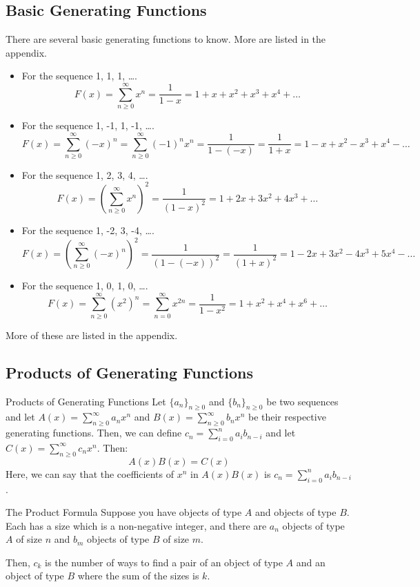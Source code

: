 \documentclass[letterpaper]{article}
\begin{document}
\subsection{Basic Generating Functions}
There are several basic generating functions to know. More are listed in the appendix.
\begin{itemize}
    \item For the sequence 1, 1, 1, \dots.
    \[F(x) = \sum_{n \geq 0}^{\infty} x^n = \frac{1}{1 - x} = 1 + x + x^2 + x^3 + x^4 + \dots\]
    
    \item For the sequence 1, -1, 1, -1, \dots.
    \[F(x) = \sum_{n \geq 0}^{\infty} (-x)^n = \sum_{n \geq 0}^{\infty} (-1)^n x^n = \frac{1}{1 - (-x)} = \frac{1}{1 + x} = 1 - x + x^2 - x^3 + x^4 - \dots\]
    
    \item For the sequence 1, 2, 3, 4, \dots.
    \[F(x) = \left(\sum_{n \geq 0}^{\infty} x^n\right)^2 = \frac{1}{(1 - x)^2} = 1 + 2x + 3x^2 + 4x^3 + \dots\]
    
    \item For the sequence 1, -2, 3, -4, \dots.
    \[F(x) = \left(\sum_{n \geq 0}^{\infty} (-x)^n\right)^2 = \frac{1}{(1 - (-x))^2} = \frac{1}{(1 + x)^2} = 1 - 2x + 3x^2 - 4x^3 + 5x^4 - \dots\]

    \item For the sequence 1, 0, 1, 0, \dots.
    \[F(x) = \sum_{n \geq 0}^{\infty} (x^2)^n = \sum_{n = 0}^{\infty} x^{2n} = \frac{1}{1 - x^2} = 1 + x^2 + x^4 + x^6 + \dots\]
\end{itemize}
More of these are listed in the appendix. 

\subsection{Products of Generating Functions}
\begin{lemma}{Products of Generating Functions}{}
    Let $\{a_n\}_{n \geq 0}$ and $\{b_n\}_{n \geq 0}$ be two sequences and let $A(x) = \sum_{n \geq 0}^{\infty} a_n x^n$ and $B(x) = \sum_{n \geq 0}^{\infty} b_n x^n$ be their respective generating functions. Then, we can define $c_n = \sum_{i = 0}^n a_i b_{n - i}$ and let $C(x) = \sum_{n \geq 0}^{\infty} c_n x^n$. Then:
    \[A(x)B(x) = C(x)\]
    Here, we can say that the coefficients of $x^n$ in $A(x)B(x)$ is $c_n = \sum_{i = 0}^n a_i b_{n - i}$.  
\end{lemma} 

\begin{theorem}{The Product Formula}{}
    Suppose you have objects of type $A$ and objects of type $B$. Each has a size which is a non-negative integer, and there are $a_n$ objects of type $A$ of size $n$ and $b_m$ objects of type $B$ of size $m$. 
    
    \bigskip 
    
    Then, $c_k$ is the number of ways to find a pair of an object of type $A$ and an object of type $B$ where the sum of the sizes is $k$. 
\end{theorem}
\end{document}
